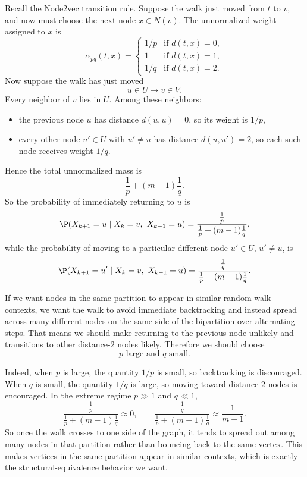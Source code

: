 \documentclass{article}
\begin{document}
\begin{tcolorbox}[colback=white, colframe=black!75, breakable, title=\textbf{Solution to Exercise 2}]
Recall the Node2vec transition rule. Suppose the walk just moved from $t$ to $v$, and now must choose the next node $x\in N(v)$. The unnormalized weight assigned to $x$ is
\[
\alpha_{pq}(t,x)=
\begin{cases}
1/p & \text{if } d(t,x)=0,\\[4pt]
1   & \text{if } d(t,x)=1,\\[4pt]
1/q & \text{if } d(t,x)=2.
\end{cases}
\]
Now suppose the walk has just moved
\[
u\in U \to v\in V.
\]
Every neighbor of $v$ lies in $U$. Among these neighbors:
\begin{itemize}
    \item the previous node $u$ has distance $d(u,u)=0$, so its weight is $1/p$,
    \item every other node $u'\in U$ with $u'\neq u$ has distance $d(u,u')=2$, so each such node receives weight $1/q$.
\end{itemize}
Hence the total unnormalized mass is
\[
\frac1p+(m-1)\frac1q.
\]
So the probability of immediately returning to $u$ is
\[
\P(X_{k+1}=u \mid X_k=v,\ X_{k-1}=u)
=
\frac{\frac1p}{\frac1p+(m-1)\frac1q},
\]
while the probability of moving to a particular different node $u'\in U$, $u'\neq u$, is
\[
\P(X_{k+1}=u' \mid X_k=v,\ X_{k-1}=u)
=
\frac{\frac1q}{\frac1p+(m-1)\frac1q}.
\]

If we want nodes in the same partition to appear in similar random-walk contexts, we want the walk to avoid immediate backtracking and instead spread across many different nodes on the same side of the bipartition over alternating steps. That means we should make returning to the previous node unlikely and transitions to other distance-$2$ nodes likely. Therefore we should choose
\[
\boxed{p\text{ large and }q\text{ small}.}
\]

Indeed, when $p$ is large, the quantity $1/p$ is small, so backtracking is discouraged. When $q$ is small, the quantity $1/q$ is large, so moving toward distance-$2$ nodes is encouraged. In the extreme regime $p\gg 1$ and $q\ll 1$,
\[
\frac{\frac1p}{\frac1p+(m-1)\frac1q}\approx 0,
\qquad
\frac{\frac1q}{\frac1p+(m-1)\frac1q}\approx \frac{1}{m-1}.
\]
So once the walk crosses to one side of the graph, it tends to spread out among many nodes in that partition rather than bouncing back to the same vertex. This makes vertices in the same partition appear in similar contexts, which is exactly the structural-equivalence behavior we want.
\end{tcolorbox}
\end{document}
